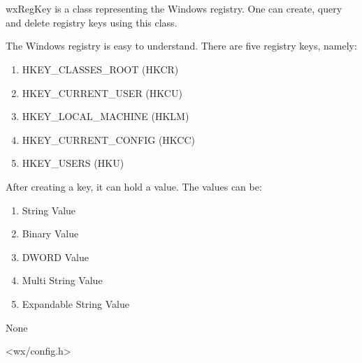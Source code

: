 
\section{}\label{wxregkey}

wxRegKey is a class representing the Windows registry. One can create, query and delete registry keys using this class.

The Windows registry is easy to understand. There are five registry keys, namely:

\begin{enumerate}\itemsep=0pt
\item HKEY\_CLASSES\_ROOT (HKCR)
\item HKEY\_CURRENT\_USER (HKCU)
\item HKEY\_LOCAL\_MACHINE (HKLM)
\item HKEY\_CURRENT\_CONFIG (HKCC)
\item HKEY\_USERS (HKU)
\end{enumerate}

After creating a key, it can hold a value. The values can be:

\begin{enumerate}\itemsep=0pt
\item String Value
\item Binary Value
\item DWORD Value
\item Multi String Value
\item Expandable String Value
\end{enumerate}


None


<wx/config.h>



